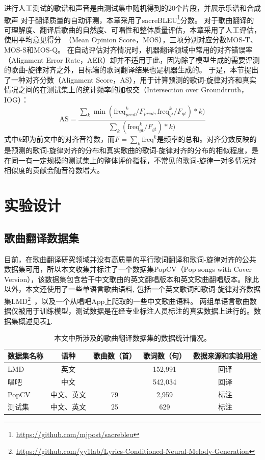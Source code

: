 进行人工测试的歌谱和声音是由测试集中随机得到的20个片段，并展示乐谱和合成歌声
对于翻译质量的自动评测，本章采用了sacreBLEU\footnote{\url{https://github.com/mjpost/sacrebleu}}分数。
对于歌曲翻译的可理解度、翻译后歌曲的自然度、可唱性和整体质量评估，本章采用了人工评估，使用平均意见得分~（Mean Opinion Score，MOS），三项分别对应分数MOS-T、MOS-S和MOS-Q。
在自动评估对齐情况时，机器翻译领域中常用的对齐错误率（Alignment Error Rate，AER）却并不适用于此，因为除了模型生成的需要评测的歌曲-旋律对齐之外，目标端的歌词翻译结果也是机器生成的。
于是，本节提出了一种对齐分数（Alignment Score，AS），用于计算预测的歌词-旋律对齐和真实情况之间的在测试集上的统计频率的加权交（Intersection over Groundtruth，IOG）：
\begin{equation}
    \text{AS} = \frac{\sum_{k}\min(\text{freq}_{pred}^k/F_{pred}, \text{freq}_{gt}^k/F_{gt}) * k)}{\sum_{k} (\text{freq}_{gt}^k/F_{gt}) * k) }
\end{equation}
式中$k$即为前文中的对齐音符数，而$F = \sum_{k} \text{freq}^k$是频率的总和。对齐分数反映的是预测的歌词-旋律对齐的分布和真实歌曲的歌词-旋律对齐的分布的相似程度，是在同一有一定规模的测试集上的整体评价指标，不常见的歌词-旋律一对多情况对相似度的贡献会随音符数增大。
\section{实验设计}
\subsection{歌曲翻译数据集}
目前，在歌曲翻译研究领域并没有高质量的平行歌词翻译和歌词-旋律对齐的公共数据集可用，所以本文收集并标注了一个数据集PopCV（Pop songs with Cover Version），该数据集包含若干中文歌曲的英文翻唱版本和英文歌曲翻唱版本。除此以外，本文还使用了一些单语言歌曲语料, 包括一个英文歌词和歌词-旋律对齐数据集LMD\footnote{\url{https://github.com/yy1lab/Lyrics-Conditioned-Neural-Melody-Generation}}~\citep{LMD}，以及一个从唱吧App上爬取的一些中文歌曲语料。
两组单语言歌曲数据仅被用于训练模型，测试数据是在经专业标注人员标注的真实数据上进行的。数据集概述见表\ref{tab:dataset_stat}.
\begin{table}[htbp]
    \centering
    \setlength{\belowcaptionskip}{8pt} %
    \caption{本文中所涉及的歌曲翻译数据集的数据统计情况。}
    \begin{tabular}{|l|c|c|c|c|}
    \hline
    \textbf{数据集名称} & \textbf{语种} & \textbf{歌曲数（首）} & \textbf{歌词数（句）} & \textbf{数据来源和实验用途}\\
    \hline
     LMD & 英文 & \diagbox[]{}{} & 152,991 & 回译\\
    \hline
     唱吧 & 中文 & \diagbox[]{}{} & 542,034 & 回译\\
    \hline
     PopCV & 中文、英文 & 79 & 2,959 & 标注\\
    \hline
     测试集 & 中文、英文 & 25 & 629 & 标注\\
    \hline
    \end{tabular}
    \label{tab:dataset_stat}
\end{table}
